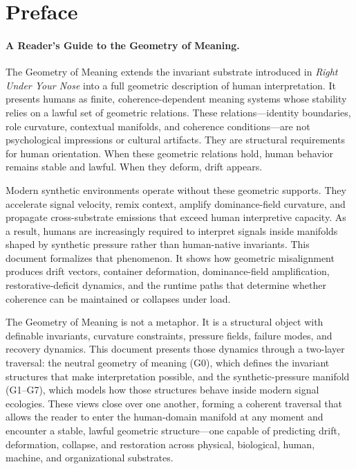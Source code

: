 \documentclass[11pt]{article}
\begin{document}
\newpage
\tableofcontents
\newpage






\newpage

\section*{Preface}

\paragraph{A Reader's Guide to the Geometry of Meaning.}
The Geometry of Meaning extends the invariant substrate introduced in
\textit{Right Under Your Nose} into a full geometric description of human
interpretation. It presents humans as finite, coherence-dependent meaning
systems whose stability relies on a lawful set of geometric relations. These
relations—identity boundaries, role curvature, contextual manifolds, and
coherence conditions—are not psychological impressions or cultural artifacts.
They are structural requirements for human orientation. When these geometric
relations hold, human behavior remains stable and lawful. When they deform,
drift appears.

\medskip

Modern synthetic environments operate without these geometric supports. They
accelerate signal velocity, remix context, amplify dominance-field curvature,
and propagate cross-substrate emissions that exceed human interpretive
capacity. As a result, humans are increasingly required to interpret signals
inside manifolds shaped by synthetic pressure rather than human-native
invariants. This document formalizes that phenomenon. It shows how geometric
misalignment produces drift vectors, container deformation, dominance-field
amplification, restorative-deficit dynamics, and the runtime paths that
determine whether coherence can be maintained or collapses under load.

\medskip

The Geometry of Meaning is not a metaphor. It is a structural object with
definable invariants, curvature constraints, pressure fields, failure modes,
and recovery dynamics. This document presents those dynamics through a
two-layer traversal: the neutral geometry of meaning (G0), which defines the
invariant structures that make interpretation possible, and the
synthetic-pressure manifold (G1--G7), which models how those structures behave
inside modern signal ecologies. These views close over one another, forming a
coherent traversal that allows the reader to enter the human-domain manifold at
any moment and encounter a stable, lawful geometric structure—one capable of
predicting drift, deformation, collapse, and restoration across physical,
biological, human, machine, and organizational substrates.
\end{document}
